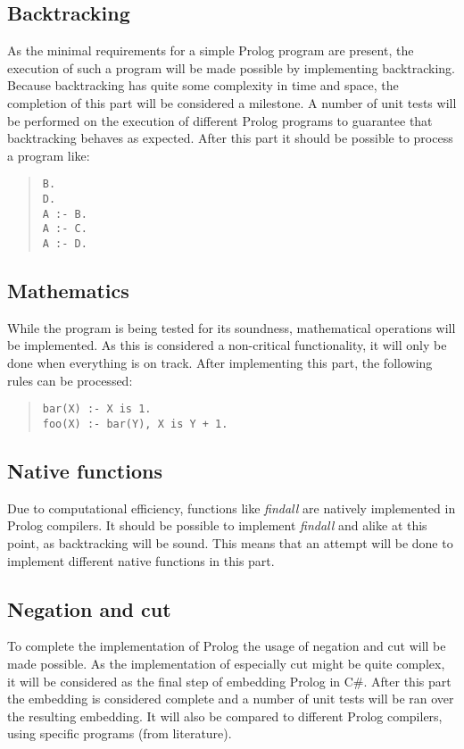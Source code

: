 \documentclass[a4paper]{article}
\begin{document}
\subsection{Backtracking}
As the minimal requirements for a simple Prolog program are present, the execution of such a program will be made possible by implementing backtracking.
Because backtracking has quite some complexity in time and space, the completion of this part will be considered a milestone.
A number of unit tests will be performed on the execution of different Prolog programs to guarantee that backtracking behaves as expected.
After this part it should be possible to process a program like:
\begin{quote}\begin{verbatim}
B.
D.
A :- B.
A :- C.
A :- D.
\end{verbatim}\end{quote}

\subsection{Mathematics}
While the program is being tested for its soundness, mathematical operations will be implemented.
As this is considered a non-critical functionality, it will only be done when everything is on track.
After implementing this part, the following rules can be processed:

\begin{quote}\begin{verbatim}
bar(X) :- X is 1.
foo(X) :- bar(Y), X is Y + 1.
\end{verbatim}\end{quote}

\subsection{Native functions}
Due to computational efficiency, functions like \textit{findall} are natively implemented in Prolog compilers.
It should be possible to implement \textit{findall} and alike at this point, as backtracking will be sound.
This means that an attempt will be done to implement different native functions in this part.

\subsection{Negation and cut}
To complete the implementation of Prolog the usage of negation and cut will be made possible.
As the implementation of especially cut might be quite complex, it will be considered as the final step of embedding Prolog in C\#.
After this part the embedding is considered complete and a number of unit tests will be ran over the resulting embedding.
It will also be compared to different Prolog compilers, using specific programs (from literature).
\end{document}
